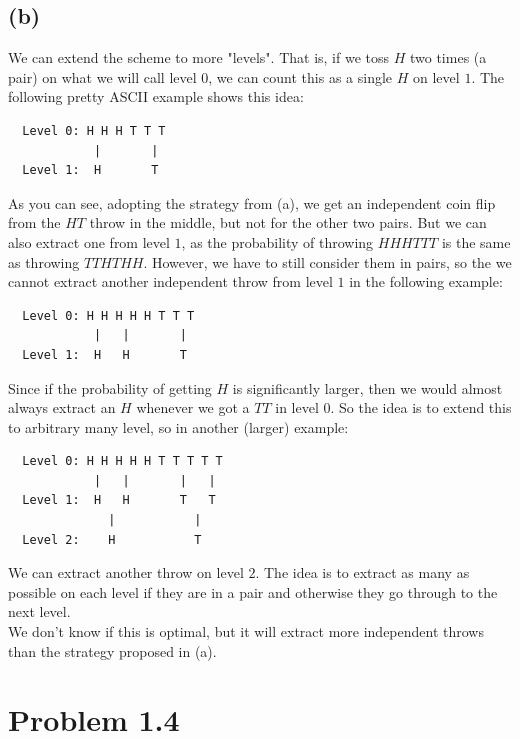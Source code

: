 \documentclass[a4paper]{article}
\begin{document}
\subsection*{(b)}
We can extend the scheme to more "levels". That is, if we toss $H$ two times (a pair) on what we will call level $0$, we can count this as a single $H$ on level $1$. The following pretty ASCII example shows this idea:
\begin{verbatim}
  Level 0: H H H T T T
            |       |
  Level 1:  H       T
\end{verbatim}
As you can see, adopting the strategy from (a), we get an independent coin flip from the $HT$ throw in the middle, but not for the other two pairs. But we can also extract one from level $1$, as the probability of throwing $HHHTTT$ is the same as throwing $TTHTHH$. However, we have to still consider them in pairs, so the we cannot extract another independent throw from level $1$ in the following example:
\begin{verbatim}
  Level 0: H H H H H T T T
            |   |       |
  Level 1:  H   H       T
\end{verbatim}
Since if the probability of getting $H$ is significantly larger, then we would almost always extract an $H$ whenever we got a $TT$ in level $0$. So the idea is to extend this to arbitrary many level, so in another (larger) example:
\begin{verbatim}
  Level 0: H H H H H T T T T T
            |   |       |   |
  Level 1:  H   H       T   T
              |           |
  Level 2:    H           T
\end{verbatim}
We can extract another throw on level $2$. The idea is to extract as many as possible on each level if they are in a pair and otherwise they go through to the next level. \\
We don't know if this is optimal, but it will extract more independent throws than the strategy proposed in (a).

\section*{Problem 1.4}
\end{document}
